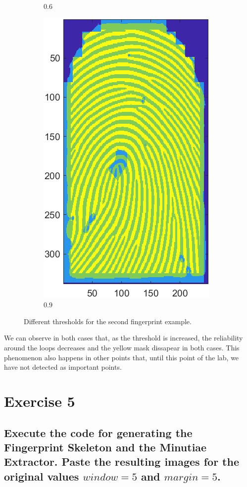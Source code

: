 \documentclass[a4paper]{article}
\begin{document}
\begin{figure}[H]
\begin{subfigure}[t]{0.2\textwidth}
      \caption{\(0.6\)}
  \end{subfigure}%
  \quad
  \begin{subfigure}[t]{0.2\textwidth}
      \centering
      \includegraphics[scale=0.5]{Figures/E4-e2-0.9}
      \caption{\(0.9\)}
  \end{subfigure}
    \caption{Different thresholds for the second fingerprint example.}
    \label{fig:ex4-2nd}
\end{figure}

We can observe in both cases that, as the threshold is increased, the reliability around the loops decreases and the yellow mask dissapear in both cases. This phenomenon also happens in other points that, until this point of the lab, we have not detected as important points.




\section{Exercise 5}
\subsection{ Execute the code for generating the Fingerprint Skeleton and the Minutiae Extractor. Paste the resulting images for the original values \(window=5\) and \(margin=5\). }
\end{document}
